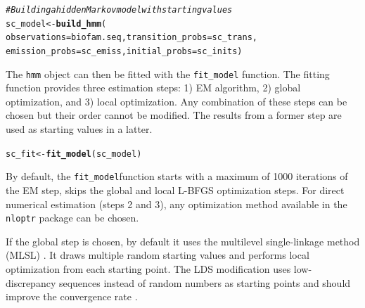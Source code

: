 \documentclass[12pt]{article}\usepackage[]{graphicx}\usepackage[]{color}
\makeatletter
\newcommand{\hlcom}[1]{\textcolor[rgb]{0.678,0.584,0.686}{\textit{#1}}}%
\newcommand{\hlstd}[1]{\textcolor[rgb]{0.345,0.345,0.345}{#1}}%
\newcommand{\hlkwb}[1]{\textcolor[rgb]{0.69,0.353,0.396}{#1}}%
\newcommand{\hlkwc}[1]{\textcolor[rgb]{0.333,0.667,0.333}{#1}}%
\newcommand{\hlkwd}[1]{\textcolor[rgb]{0.737,0.353,0.396}{\textbf{#1}}}%
\newenvironment{kframe}{%
 \def\at@end@of@kframe{}%
 \ifinner\ifhmode%
  \def\at@end@of@kframe{\end{minipage}}%
  \begin{minipage}{\columnwidth}%
 \fi\fi%
 \def\FrameCommand##1{\hskip\@totalleftmargin \hskip-\fboxsep
 \colorbox{shadecolor}{##1}\hskip-\fboxsep
     \hskip-\linewidth \hskip-\@totalleftmargin \hskip\columnwidth}%
 \MakeFramed {\advance\hsize-\width
   \@totalleftmargin\z@ \linewidth\hsize
   \@setminipage}}%
 {\par\unskip\endMakeFramed%
 \at@end@of@kframe}
\newenvironment{knitrout}{}{} %
\makeatother
\begin{document}
\begin{knitrout}
\color{fgcolor}\begin{kframe}
\begin{alltt}
\hlcom{# Building a hidden Markov model with starting values}
\hlstd{sc_model} \hlkwb{<-} \hlkwd{build_hmm}\hlstd{(}
  \hlkwc{observations} \hlstd{= biofam.seq,} \hlkwc{transition_probs} \hlstd{= sc_trans,}
  \hlkwc{emission_probs} \hlstd{= sc_emiss,} \hlkwc{initial_probs} \hlstd{= sc_inits)}
\end{alltt}
\end{kframe}
\end{knitrout}
The \texttt{hmm} object can then be fitted with the \texttt{fit\_model} function. The fitting function provides three estimation steps: 1) EM algorithm, 2) global optimization, and 3) local optimization. Any combination of these steps can be chosen but their order cannot be modified. The results from a former step are used as starting values in a latter.

\begin{knitrout}
\color{fgcolor}\begin{kframe}
\begin{alltt}
\hlstd{sc_fit} \hlkwb{<-} \hlkwd{fit_model}\hlstd{(sc_model)}
\end{alltt}
\end{kframe}
\end{knitrout}

By default, the \texttt{fit\_model}function starts with a maximum of 1000 iterations of the EM step, skips the global and local L-BFGS optimization steps. For direct numerical estimation (steps 2 and 3), any optimization method available in the \texttt{nloptr} package \citep{nloptr, nlopt} can be chosen.

If the global step is chosen, by default it uses the multilevel single-linkage method (MLSL) \citep{Kan1987I, Kan1987II}. It draws multiple random starting values and performs local optimization from each starting point. The LDS modification uses low-discrepancy sequences instead of random numbers as starting points and should improve the convergence rate \citep{Kucherenko2005}.
\end{document}
